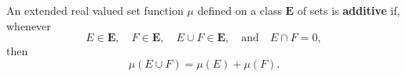 An extended real valued set function $\mu$ defined on a class $\mathbf{E}$ of sets is \textbf{additive} if, whenever
$$E \in \mathbf{E},\quad F \in \mathbf{E},\quad E \cup F \in \mathbf{E},\quad \text{and}\quad E \cap F = 0,$$
then
$$\mu(E \cup F) = \mu(E) + \mu(F).$$
